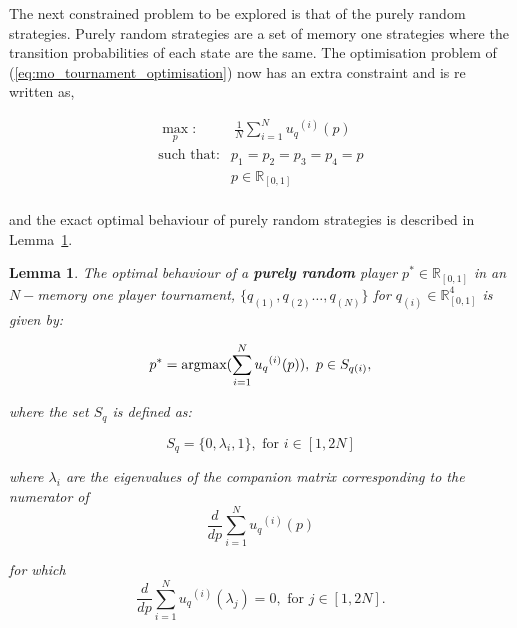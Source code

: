 \documentclass[10pt]{article}
\newcommand{\R}{\mathbb{R}}
\newtheorem{lemma}[theorem]{Lemma}
\begin{document}
The next constrained problem to be explored is that of the purely random strategies.
Purely random strategies are a set of memory one strategies where the transition
probabilities of each state are the same. The optimisation problem of (\ref{eq:mo_tournament_optimisation})
now has an extra constraint and is re written as,

\begin{equation}\label{eq:random_optimisation}
\begin{aligned}
\max_p: & \ \frac{1}{N} \sum_{i=1} ^ {N} {u_q}^{(i)} (p)
\\
\text{such that}: & p_1 = p_2 = p_3 = p_4 = p \\
                  & p \in \R_{[0, 1]} \\
\end{aligned}
\end{equation}

and the exact optimal behaviour of purely random strategies is described in
Lemma~\ref{lemma:purely_optimisation}.

\begin{lemma}
    \label{lemma:purely_optimisation}
    The optimal behaviour of a \textbf{purely random} player \(p ^ * \in \R_{[0, 1]}\)
    in an \(N-\)memory one player tournament, \(\{q_{(1)}, q_{(2)} \dots,q_{(N)} \}
    \) for \(q_{(i)} \in \R_{[0, 1]} ^ 4\) is given by:

    \[p^* = \textnormal{argmax}(\sum_{i=1} ^ {N} {u_q}^{(i)} (p) ), \ p \in S_{q(i)},\]

    where the set \(S_{q}\) is defined as:

    \[S_{q} = \{0, \lambda_i, 1\},\text{ for } i \in [1, 2N]\]

    where \(\lambda_i\) are the eigenvalues of the companion matrix corresponding
    to the numerator of \[\frac{d}{dp} \sum_{i=1} ^ {N} {u_q}^{(i)} (p)\]

    for which
    \[\frac{d}{dp} \sum_{i=1} ^ {N} {u_q}^{(i)} (\lambda_j) = 0,\text{ for } j \in [1, 2N].\]
\end{lemma}
\end{document}
